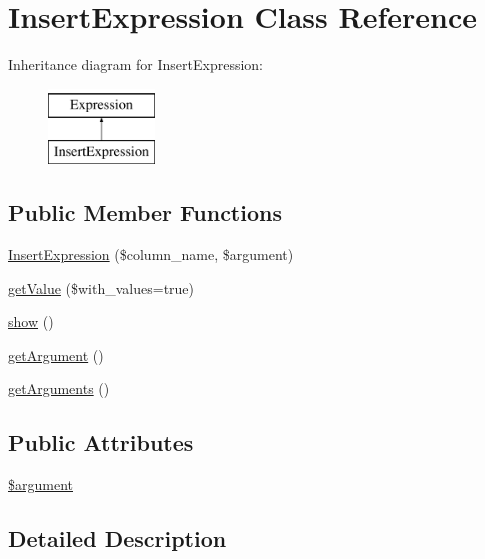 \hypertarget{classInsertExpression}{\section{Insert\-Expression Class Reference}
\label{classInsertExpression}
}
Inheritance diagram for Insert\-Expression\-:\begin{figure}[H]
\begin{center}
\leavevmode
\includegraphics[height=2.000000cm]{classInsertExpression}
\end{center}
\end{figure}
\subsection*{Public Member Functions}
\begin{DoxyCompactItemize}
\item 
\hyperlink{classInsertExpression_af74e1c580c2f1691cdd1bc22c221bc8f}{Insert\-Expression} (\$column\-\_\-name, \$argument)
\item 
\hyperlink{classInsertExpression_ad9d21fa7983a8d93730c6d16b24a0c32}{get\-Value} (\$with\-\_\-values=true)
\item 
\hyperlink{classInsertExpression_a31b4e3976aeb6d73a8f8dba3cd055c29}{show} ()
\item 
\hyperlink{classInsertExpression_aa0f93cc5194b4605d63f96b53f3d037d}{get\-Argument} ()
\item 
\hyperlink{classInsertExpression_aa18be08ea777a25c8f06505d8710ced2}{get\-Arguments} ()
\end{DoxyCompactItemize}
\subsection*{Public Attributes}
\begin{DoxyCompactItemize}
\item 
\hyperlink{classInsertExpression_a0a8efa361a069392a3cca64a675023e0}{\$argument}
\end{DoxyCompactItemize}


\subsection{Detailed Description}


